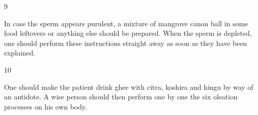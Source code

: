 \begin{translation}
        
  

\newpage
  \begin{tt}
     \bigskip
     \raggedright
 
% 
% 
% 
 
 \item[9]
 
  In case the sperm appears purulent, a mixture of mangrove canon ball in some 
  food leftovers or anything else should be prepared. When the sperm is 
  depleted, one should perform these instructions straight away as soon as they 
  have been explained.
 
 \item[10]
 
  One should make the patient drink ghee with citra, koshira and hingu by way of 
  an antidote. A wise person should then perform one by one the six oleation 
  processes on his own body.
  

\end{tt}
\end{translation}

